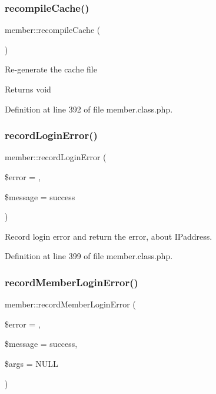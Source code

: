\subsubsection{\texorpdfstring{recompile\+Cache()}{recompileCache()}}
{\footnotesize\ttfamily member\+::recompile\+Cache (\begin{DoxyParamCaption}{ }\end{DoxyParamCaption})}

Re-\/generate the cache file

\begin{DoxyReturn}{Returns}
void 
\end{DoxyReturn}


Definition at line 392 of file member.\+class.\+php.

\mbox{\label{classmember_ac7aa72e76a771976a3aaae4baf31477d}} 
\subsubsection{\texorpdfstring{record\+Login\+Error()}{recordLoginError()}}
{\footnotesize\ttfamily member\+::record\+Login\+Error (\begin{DoxyParamCaption}\item[{}]{\$error = {},  }\item[{}]{\$message = {\ttfamily \textquotesingle{}success\textquotesingle{}} }\end{DoxyParamCaption})}



Record login error and return the error, about I\+Paddress. 



Definition at line 399 of file member.\+class.\+php.

\mbox{\label{classmember_ad43b5bae89e7d46d2498f853c10414cb}} 
\subsubsection{\texorpdfstring{record\+Member\+Login\+Error()}{recordMemberLoginError()}}
{\footnotesize\ttfamily member\+::record\+Member\+Login\+Error (\begin{DoxyParamCaption}\item[{}]{\$error = {},  }\item[{}]{\$message = {\ttfamily \textquotesingle{}success\textquotesingle{}},  }\item[{}]{\$args = {\ttfamily NULL} }\end{DoxyParamCaption})}



